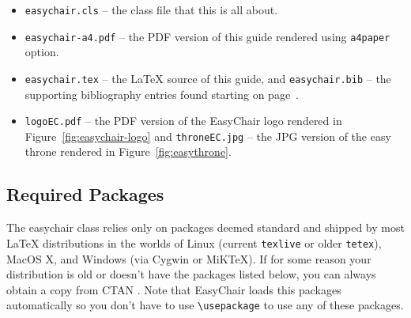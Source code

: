 \documentclass{imav2013}
\newcommand{\easychair}{\textsf{easychair}}
\newcommand{\miktex}{MiK{\TeX}}
\newcommand{\texniccenter}{{\TeX}nicCenter}
\newcommand{\makefile}{\texttt{Makefile}}
\begin{document}
\begin{itemize}
\item
\texttt{easychair.cls} -- the class file that this is all about.

\item
\texttt{easychair-a4.pdf} -- the PDF version of this guide rendered using 
\texttt{a4paper} option.

\item
\texttt{easychair.tex} -- the {\LaTeX} source of this guide, 
and
\texttt{easychair.bib} -- the supporting bibliography entries found starting 
on page~\pageref{sect:bib}.


\item
\texttt{logoEC.pdf} -- the PDF version of the EasyChair logo rendered in
Figure~\ref{fig:easychair-logo}
and
\texttt{throneEC.jpg} -- the JPG version of the easy throne rendered in 
Figure~\ref{fig:easythrone}.

\end{itemize}

\subsection{Required Packages}

The {\easychair} class relies only on packages deemed standard and shipped by
most {\LaTeX} distributions in the worlds of Linux (current \texttt{texlive} \cite{texlive}
or older \texttt{tetex}), MacOS X,
and Windows (via Cygwin or {\miktex}).
If for some reason your distribution is old or doesn't have the packages
listed below, you can always obtain a copy from CTAN \cite{ctan}. Note
that EasyChair loads this packages automatically so you don't have to
use \verb|\usepackage| to use any of these packages.
\end{document}
